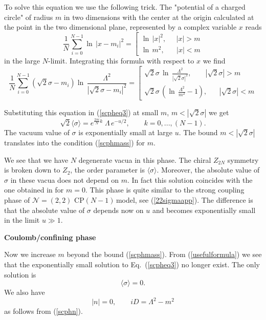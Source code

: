 \documentclass[epsfig,12pt]{article}
\def\beq{\begin{equation}}
\def\eeq{\end{equation}}
\newcommand{\cpn}{CP$(N-1)\,$}
\def\beq{\begin{equation}}
\def\eeq{\end{equation}}
\newcommand{\ntwot}{${\mathcal N}= \left(2,2\right) $ }
\begin{document}
{To solve this equation we use the following trick. The "potential of a charged circle" 
of radius $m$ in 
two dimensions with the center at the origin calculated at the point in the two dimensional plane, represented by a complex  variable  $x$ reads
\beq
\frac{1}{N}\sum_{i=0}^{N-1}\ln\, {|x-m_i|^2}
=\left[
\begin{array}{cc}
\ln\,{|x|^2},\;\;\;\;\; |x|>m\\
\ln\,{m^2},\;\;\;\;\;\; |x|<m
\end{array}
\right.
\label{chargedcircle}
\eeq
in the large $N$-limit. Integrating this formula with respect to $x$ we find
\beq
 \frac{1}{N}\sum_{i=0}^{N-1}\left(\sqrt{2}\sigma-m_i\right)\ln\, {\frac{\Lambda^2}{|\sqrt{2}\sigma-m_i|^2}}
=\left[
\begin{array}{cc}
\sqrt{2}\sigma\,\ln\, {\frac{\Lambda^2}{|\sqrt{2}\sigma|^2}},\;\;\;\;\;\;\; |\sqrt{2}\sigma|>m\\
\sqrt{2}\sigma\,\left(\ln\, {\frac{\Lambda^2}{m^2}}-1\right),\;\;\;\;\;\; |\sqrt{2}\sigma|<m
\end{array}
\right.
\label{usefulformula}
\eeq

Substituting this equation in (\ref{scpheq3}) at small $m$, $m<|\sqrt{2}\sigma|$ we get
\beq
\sqrt{2}\langle \sigma\rangle=e^{\frac{2\pi i}{N}k}\;\Lambda\,e^{-u/2},\qquad k=0,...,(N-1).
\label{scphsigma}
\eeq
The vacuum value of $\sigma$ is exponentially small at large $u$. The bound $m<|\sqrt{2}\sigma|$
translates into the condition (\ref{scphmass}) for  $m$. 

We see that we have $N$ degenerate vacua in this phase. The  chiral $Z_{2N}$ symmetry is broken
down to $Z_2$, the order parameter is $\langle \sigma\rangle$. Moreover, the absolute value of $\sigma$ in these vacua does not depend on $m$.
In fact this solution coincides with the one obtained in \cite{SYhet} for $m=0$. This phase
is quite similar to the strong coupling phase of \ntwot \cpn model, see (\ref{22sigmaapp}).
The difference is that the absolute value of $\sigma$ depends now on $u$ and becomes exponentially
small in the limit $u\gg 1$.


\begin{center}
{\bf Coulomb/confining phase}
\end{center}

Now we increase $m$ beyond the bound (\ref{scphmass}). From (\ref{usefulformula}) we see that the 
exponentially small solution to Eq.~(\ref{scpheq3}) no longer exist. The only solution is
\beq
\langle \sigma\rangle=0.
\label{confsigma}
\eeq
We also have
\beq
|n|=0,\qquad iD= \Lambda^2-m^2
\label{confnD}
\eeq
as follows from (\ref{scphn}).

}
\end{document}
